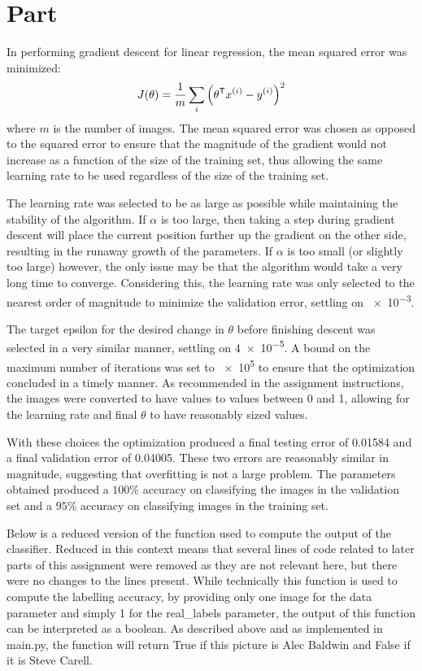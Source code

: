 \documentclass{article}
\newcommand{\enterproblemHeader}[1]{
}
\newcommand{\exitproblemHeader}[1]{
}
\newcounter{problem} %
\newcommand{\problemName}{}
\newenvironment{problem}[1][Part \theproblem]{ %
	\stepcounter{problem} %
	\renewcommand{\problemName}{#1} %
	\section{\problemName} %
	\enterproblemHeader{\problemName} %
}{
	\exitproblemHeader{\problemName} %
}
\begin{document}

\begin{problem}
	In performing gradient descent for linear regression, the mean squared error was minimized:
	\begin{equation*}
		J(\theta) = \frac{1}{m}\sum_i \qty(\theta^\mathsf{T}x^{(i)} - y^{(i)})^2
	\end{equation*}
	where \(m\) is the number of images. The mean squared error was chosen as opposed to the squared error to ensure that the magnitude of the gradient would not increase as a function of the size of the training set, thus allowing the same learning rate to be used regardless of the size of the training set.
	
	The learning rate was selected to be as large as possible while maintaining the stability of the algorithm. If \(\alpha\) is too large, then taking a step during gradient descent will place the current position further up the gradient on the other side, resulting in the runaway growth of the parameters. If \(\alpha\) is too small (or slightly too large) however, the only issue may be that the algorithm would take a very long time to converge. Considering this, the learning rate was only selected to the nearest order of magnitude to minimize the validation error, settling on \num{e-3}. 
	
	The target epsilon for the desired change in \(\theta\) before finishing descent was selected in a very similar manner, settling on \num{4e-5}. A bound on the maximum number of iterations was set to \num{e5} to ensure that the optimization concluded in a timely manner. As recommended in the assignment instructions, the images were converted to have values to values between 0 and 1, allowing for the learning rate and final \(\theta\) to have reasonably sized values.
	
	With these choices the optimization produced a final testing error of 0.01584 and a final validation error of 0.04005. These two errors are reasonably similar in magnitude, suggesting that overfitting is not a large problem. The parameters obtained produced a \(100\%\) accuracy on classifying the images in the validation set and a \(95\%\) accuracy on classifying images in the training set.
	
	Below is a reduced version of the function used to compute the output of the classifier. Reduced in this context means that several lines of code related to later parts of this assignment were removed as they are not relevant here, but there were no changes to the lines present. While technically this function is used to compute the labelling accuracy, by providing only one image for the data parameter and simply 1 for the real\_labels parameter, the output of this function can be interpreted as a boolean. As described above and as implemented in main.py, the function will return True if this picture is Alec Baldwin and False if it is Steve Carell.
	

\end{problem}
\end{document}
